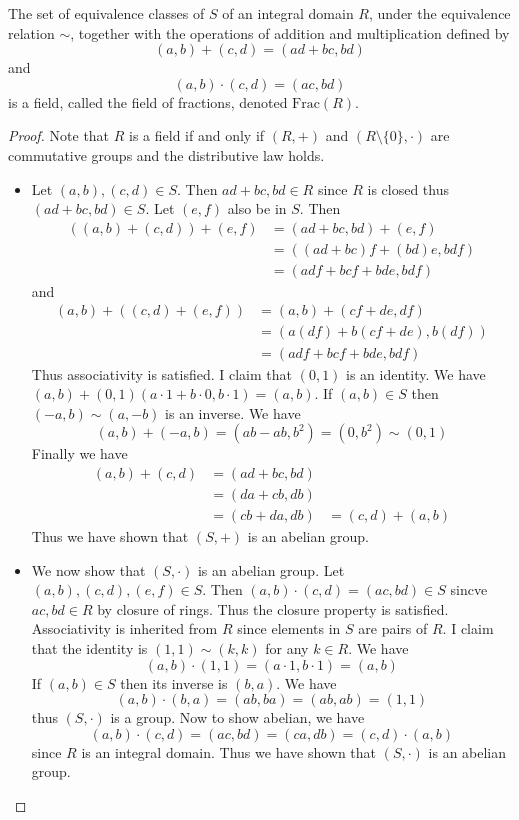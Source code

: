\documentclass[a4paper]{article}
\begin{document}
\begin{prp}{}{} The set of equivalence classes of $S$ of an integral domain $R$, under the equivalence relation $\sim$, together with the operations of addition and multiplication defined by $$(a,b)+(c,d)=(ad+bc,bd)$$ and $$(a,b)\cdot(c,d)=(ac,bd)$$ is a field, called the field of fractions, denoted $\text{Frac}(R)$. 
\begin{proof} Note that $R$ is a field if and only if $(R,+)$ and $(R\setminus\{0\},\cdot)$ are commutative groups and the distributive law holds. 
\begin{itemize}
\item Let $(a,b),(c,d)\in S$. Then $ad+bc,bd\in R$ since $R$ is closed thus $(ad+bc,bd)\in S$. Let $(e,f)$ also be in $S$. Then 
\begin{align*}
((a,b)+(c,d))+(e,f)&=(ad+bc,bd)+(e,f)\\
&=((ad+bc)f+(bd)e,bdf)\\
&=(adf+bcf+bde,bdf)
\end{align*}
and 
\begin{align*}
(a,b)+((c,d)+(e,f))&=(a,b)+(cf+de,df)\\
&=(a(df)+b(cf+de),b(df))\\
&=(adf+bcf+bde,bdf)
\end{align*}
Thus associativity is satisfied. I claim that $(0,1)$ is an identity. We have $(a,b)+(0,1)(a\cdot 1+b\cdot 0,b\cdot 1)=(a,b)$. If $(a,b)\in S$ then $(-a,b)\sim(a,-b)$ is an inverse. We have $$(a,b)+(-a,b)=(ab-ab,b^2)=(0,b^2)\sim(0,1)$$ Finally we have 
\begin{align*}
(a,b)+(c,d)&=(ad+bc,bd)\\
&=(da+cb,db)\tag{$R$ is an Integral Domain}\\
&=(cb+da,db)\tag{$R$ is an abelian group}
&=(c,d)+(a,b)
\end{align*}
Thus we have shown that $(S,+)$ is an abelian group. 
\item We now show that $(S,\cdot)$ is an abelian group. Let $(a,b),(c,d),(e,f)\in S$. Then $(a,b)\cdot(c,d)=(ac,bd)\in S$ sincve $ac,bd\in R$ by closure of rings. Thus the closure property is satisfied. Associativity is inherited from $R$ since elements in $S$ are pairs of $R$. I claim that the identity is $(1,1)\sim(k,k)$ for any $k\in R$. We have $$(a,b)\cdot(1,1)=(a\cdot1,b\cdot 1)=(a,b)$$ If $(a,b)\in S$ then its inverse is $(b,a)$. We have $$(a,b)\cdot(b,a)=(ab,ba)=(ab,ab)=(1,1)$$ thus $(S,\cdot)$ is a group. Now to show abelian, we have $$(a,b)\cdot(c,d)=(ac,bd)=(ca,db)=(c,d)\cdot(a,b)$$ since $R$ is an integral domain. Thus we have shown that $(S,\cdot)$ is an abelian group. 

\end{itemize}
\end{proof}
\end{prp}
\end{document}
